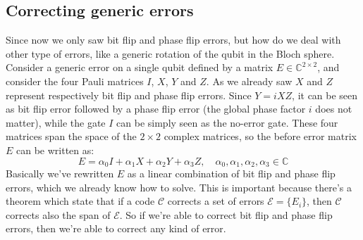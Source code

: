\documentclass{article}
\begin{document}
	\subsection{Correcting generic errors}
	Since now we only saw bit flip and phase flip errors, but how do we deal with other type of errors, like a generic rotation of the qubit in the Bloch sphere. Consider a generic error on a single qubit defined by a matrix $E \in \mathbb{C}^{2 \times 2}$, and consider the four Pauli matrices $I$, $X$, $Y$ and $Z$. As we already saw $X$ and $Z$ represent respectively bit flip and phase flip errors. Since $Y = iXZ$, it can be seen as bit flip error followed by a phase flip error (the global phase factor $i$ does not matter), while the gate $I$ can be simply seen as the no-error gate. These four matrices span the space of the $2 \times 2$ complex matrices, so the before error matrix $E$ can be written as:
	\[ E = \alpha_0I + \alpha_1X + \alpha_2Y + \alpha_3Z, \quad \alpha_0, \alpha_1, \alpha_2, \alpha_3 \in \mathbb{C}\]
	Basically we've rewritten $E$ as a linear combination of bit flip and phase flip errors, which we already know how to solve. This is important because there's a theorem which state that if a code $\mathcal{C}$ corrects a set of errors $\mathcal{E} = \{E_i\}$, then $\mathcal{C}$ corrects also the span of $\mathcal{E}$. So if we're able to correct bit flip and phase flip errors, then we're able to correct any kind of error.
	
\end{document}

